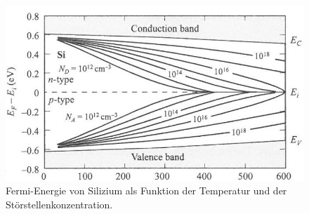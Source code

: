\documentclass[a4paper,12pt]{article}
\begin{document}
\begin{figure}[p]
\centering
\includegraphics[scale=0.7]{Fermi_Density.jpeg}
\caption{Fermi-Energie von Silizium als Funktion der Temperatur und der Störstellenkonzentration. \cite{lit:Sze07}}
\label{fig:fermi_density}
\end{figure}
\end{document}

